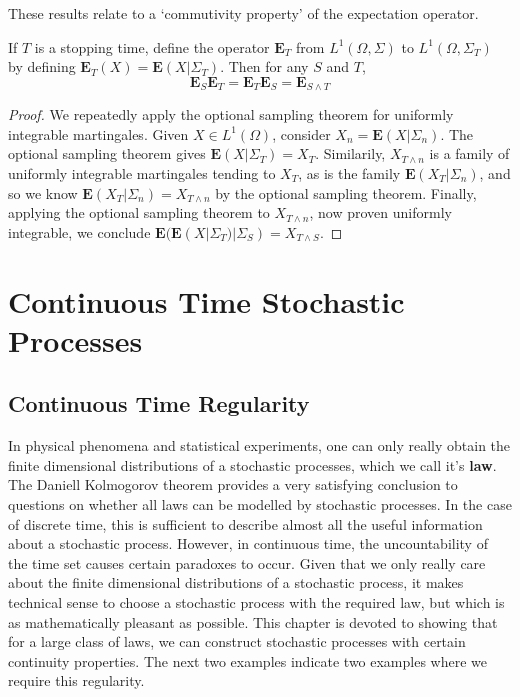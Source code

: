 These results relate to a `commutivity property' of the expectation operator.

\begin{theorem}
    If $T$ is a stopping time, define the operator $\mathbf{E}_T$ from $L^1(\Omega, \Sigma)$ to $L^1(\Omega, \Sigma_T)$ by defining $\mathbf{E}_T(X) = \mathbf{E}(X|\Sigma_T)$. Then for any $S$ and $T$,
    \[ \mathbf{E}_S \mathbf{E}_T = \mathbf{E}_T \mathbf{E}_S = \mathbf{E}_{S \wedge T} \]
\end{theorem}
\begin{proof}
    We repeatedly apply the optional sampling theorem for uniformly integrable martingales. Given $X \in L^1(\Omega)$, consider $X_n = \mathbf{E}(X|\Sigma_n)$. The optional sampling theorem gives $\mathbf{E}(X|\Sigma_T) = X_T$. Similarily, $X_{T \wedge n}$ is a family of uniformly integrable martingales tending to $X_T$, as is the family $\mathbf{E}(X_T|\Sigma_n)$, and so we know $\mathbf{E}(X_T|\Sigma_n) = X_{T \wedge n}$ by the optional sampling theorem. Finally, applying the optional sampling theorem to $X_{T \wedge n}$, now proven uniformly integrable, we conclude $\mathbf{E}(\mathbf{E}(X|\Sigma_T)|\Sigma_S) = X_{T \wedge S}$.
\end{proof}

\part{Continuous Time Stochastic Processes}

\chapter{Continuous Time Regularity}

In physical phenomena and statistical experiments, one can only really obtain the finite dimensional distributions of a stochastic processes, which we call it's {\bf law}. The Daniell Kolmogorov theorem provides a very satisfying conclusion to questions on whether all laws can be modelled by stochastic processes. In the case of discrete time, this is sufficient to describe almost all the useful information about a stochastic process. However, in continuous time, the uncountability of the time set causes certain paradoxes to occur. Given that we only really care about the finite dimensional distributions of a stochastic process, it makes technical sense to choose a stochastic process with the required law, but which is as mathematically pleasant as possible. This chapter is devoted to showing that for a large class of laws, we can construct stochastic processes with certain continuity properties. The next two examples indicate two examples where we require this regularity.

